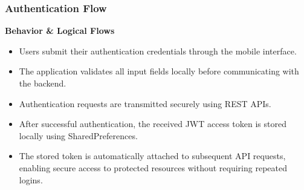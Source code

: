 
\subsubsection{Authentication Flow}

\vspace{0.2cm}
\noindent\textbf{Behavior \& Logical Flows}

\begin{itemize}
    \item Users submit their authentication credentials through the mobile interface.
    \item The application validates all input fields locally before communicating with the backend.
    \item Authentication requests are transmitted securely using REST APIs.
    \item After successful authentication, the received JWT access token is stored locally using SharedPreferences.
    \item The stored token is automatically attached to subsequent API requests, enabling secure access to protected resources without requiring repeated logins.
\end{itemize}